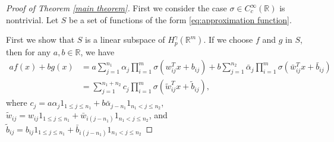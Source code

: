 \documentclass[10pt,a4paper]{amsart}
\newcommand\bR{\mathbb{R}}
\begin{document}
\begin{proof}[Proof of Theorem \ref{main theorem}]
First we consider the case $\sigma\in C_{c}^{\infty}(\bR)$ is nontrivial. Let $S$ be a set of functions of the form \eqref{eq:approximation function}. 

First we show that $S$ is a linear subspace of $H_p^\gamma(\bR^{m})$. If we choose $f$ and $g$ in $S$, then for any $a,b\in\bR$, we have
\begin{equation*}
\begin{aligned}
af(x) + bg(x)
&= a\sum_{j = 1}^{n_{1}}\alpha_{j} \prod_{i = 1}^{m}\sigma\left( w^{T}_{ij} x + b_{ij} \right) + b\sum_{j = 1}^{n_{2}}\bar\alpha_{j} \prod_{i = 1}^{m}\sigma\left( \bar w^{T}_{ij} x + \bar b_{ij} \right) \\
&= \sum_{j = 1}^{n_{1} + n_{2}}c_{j} \prod_{i = 1}^{m}\sigma\left( \tilde w^{T}_{ij} x + \tilde b_{ij} \right),
\end{aligned}
\end{equation*}
where $c_{j} = a\alpha_{j}1_{1\leq j \leq n_{1}} +b\bar \alpha_{j-n_{1}}1_{n_{1} < j \leq n_{2}}$, $\tilde w_{ij} = w_{ij}1_{1\leq j \leq n_{1}}+\bar w_{i(j-n_{1})}1_{n_{1} < j \leq n_{2}}$, and $\tilde b_{ij} = b_{ij}1_{1\leq j \leq n_{1}}+\bar b_{i(j-n_{1})}1_{n_{1} < j \leq n_{2}}$


\end{proof}
\end{document}
